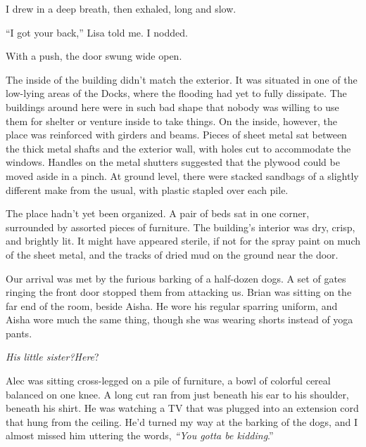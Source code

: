








I drew in a deep breath, then exhaled, long and slow.



``I got your back,'' Lisa told me.  I nodded.



With a push, the door swung wide open.



The inside of the building didn't match the exterior.  It was situated in one of the low-lying areas of the Docks, where the flooding had yet to fully dissipate.  The buildings around here were in such bad shape that nobody was willing to use them for shelter or venture inside to take things.  On the inside, however, the place was reinforced with girders and beams.  Pieces of sheet metal sat between the thick metal shafts and the exterior wall, with holes cut to accommodate the windows.  Handles on the metal shutters suggested that the plywood could be moved aside in a pinch.  At ground level, there were stacked sandbags of a slightly different make from the usual, with plastic stapled over each pile.



The place hadn't yet been organized.  A pair of beds sat in one corner, surrounded by assorted pieces of furniture.  The building's interior was dry, crisp, and brightly lit.  It might have appeared sterile, if not for the spray paint on much of the sheet metal, and the tracks of dried mud on the ground near the door.



Our arrival was met by the furious barking of a half-dozen dogs.  A set of gates ringing the front door stopped them from attacking us.  Brian was sitting on the far end of the room, beside Aisha.  He wore his regular sparring uniform, and Aisha wore much the same thing, though she was wearing shorts instead of yoga pants.



\emph{His little sister?}\emph{Here}?



Alec was sitting cross-legged on a pile of furniture, a bowl of colorful cereal balanced on one knee.  A long cut ran from just beneath his ear to his shoulder, beneath his shirt.  He was watching a TV that was plugged into an extension cord that hung from the ceiling.  He'd turned my way at the barking of the dogs, and I almost missed him uttering the words, \emph{``You gotta be kidding}.''



